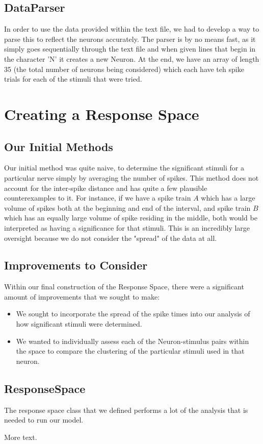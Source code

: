\documentclass[12pt]{article} %
\begin{document}



\subsection{DataParser}
In order to use the data provided within the text file, we had to develop a way to parse this to reflect the neurons accurately. The parser is by no means fast, as it simply goes sequentially through the text file and when given lines that begin in the character 'N' it creates a new Neuron. At the end, we have an array of length 35  (the total number of neurons being considered) which each have teh spike trials for each of the stimuli that were tried. 

\section{Creating a Response Space}
\subsection{Our Initial Methods}
Our initial method was quite naive, to determine the significant stimuli for a particular nerve simply by averaging the number of spikes. This method does not account for the inter-spike distance and has quite a few plausible counterexamples to it. For instance, if we have a spike train $A$ which has a large volume of spikes both at the beginning and end of the interval, and spike train $B$ which has an equally large volume of spike residing in the middle, both would be interpreted as having a significance for that stimuli. This is an incredibly large oversight because we do not consider the "spread" of the data at all. 

\subsection{Improvements to Consider}
Within our final construction of the Response Space, there were a significant amount of improvements that we sought to make:
\begin{itemize}
\item We sought to incorporate the spread of the spike times into our analysis of how significant stimuli were determined.

\item We wanted to individually assess each of the Neuron-stimulus pairs within the space to compare the clustering of the particular stimuli used in that neuron. 



\end{itemize}
 



\subsection{ResponseSpace}
The response space class that we defined performs a lot of the analysis that is needed to run our model. 


More text.
\end{document}
